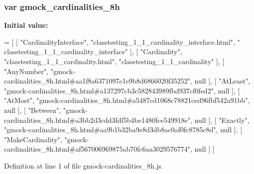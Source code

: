 \subsubsection[{\texorpdfstring{gmock\+\_\+cardinalities\+\_\+8h}{gmock_cardinalities_8h}}]{\setlength{\rightskip}{0pt plus 5cm}var gmock\+\_\+cardinalities\+\_\+8h}\hypertarget{gmock-cardinalities__8h_8js_a127dac93017d25939088596367c3de29}{}\label{gmock-cardinalities__8h_8js_a127dac93017d25939088596367c3de29}
{\bfseries Initial value\+:}
\begin{DoxyCode}
=
[
    [ \textcolor{stringliteral}{"CardinalityInterface"}, \textcolor{stringliteral}{"classtesting\_1\_1\_cardinality\_interface.html"}, \textcolor{stringliteral}{"
      classtesting\_1\_1\_cardinality\_interface"} ],
    [ \textcolor{stringliteral}{"Cardinality"}, \textcolor{stringliteral}{"classtesting\_1\_1\_cardinality.html"}, \textcolor{stringliteral}{"classtesting\_1\_1\_cardinality"} ],
    [ \textcolor{stringliteral}{"AnyNumber"}, \textcolor{stringliteral}{"gmock-cardinalities\_8h.html#aa1f8a6371097e1e9b8d6866020f35252"}, null ],
    [ \textcolor{stringliteral}{"AtLeast"}, \textcolor{stringliteral}{"gmock-cardinalities\_8h.html#a137297cb3c582843989fbd937cf0fed2"}, null ],
    [ \textcolor{stringliteral}{"AtMost"}, \textcolor{stringliteral}{"gmock-cardinalities\_8h.html#a5487cd1068c78821ced96fbf542a91bb"}, null ],
    [ \textcolor{stringliteral}{"Between"}, \textcolor{stringliteral}{"gmock-cardinalities\_8h.html#a3bb2d3cdd3fdf5b4be1480fce549918e"}, null ],
    [ \textcolor{stringliteral}{"Exactly"}, \textcolor{stringliteral}{"gmock-cardinalities\_8h.html#aa9b1b32ba9e8d3db8ac0af0fc8785c8d"}, null ],
    [ \textcolor{stringliteral}{"MakeCardinality"}, \textcolor{stringliteral}{"gmock-cardinalities\_8h.html#af567006969875ab70fc6aa3029576774"}, null ]
]
\end{DoxyCode}


Definition at line 1 of file gmock-\/cardinalities\+\_\+8h.\+js.

